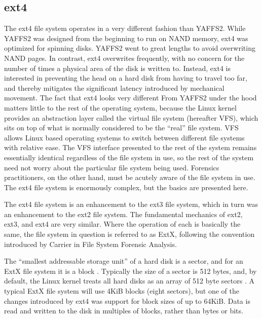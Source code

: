 \subsection{ext4}
The ext4 file system operates in a very different fashion than YAFFS2. While YAFFS2 was designed from the beginning to run on NAND
memory, ext4 was optimized for spinning disks. YAFFS2 went to great lengths to avoid overwriting NAND pages. In contrast, ext4
overwrites frequently, with no concern for the number of times a physical area of the disk is written to. Instead, ext4 is
interested in preventing the head on a hard disk from having to travel too far, and thereby mitigates the significant latency
introduced by mechanical movement. The fact that ext4 looks very different From YAFFS2 under the hood matters little to the rest of
the operating system, because the Linux kernel provides an abstraction layer called the virtual file system (hereafter VFS), which
sits on top of what is normally considered to be the ``real'' file system. VFS allows Linux based operating systems to switch
between different file systems with relative ease. The VFS interface presented to the rest of the system remains essentially
identical regardless of the file system in use, so the rest of the system need not worry about the particular file system being
used. Forensics practitioners, on the other hand, must be acutely aware of the file system in use. The ext4 file system is
enormously complex, but the basics are presented here.

The ext4 file system is an enhancement to the ext3 file system, which in turn was an enhancement to the
ext2 file system. The fundamental mechanics of ext2, ext3, and ext4 are very similar. Where the
operation of each is basically the same, the file system in question is referred to as ExtX, following the convention
introduced by Carrier \citeyear{carrier} in File System Forensic Analysis. 

The ``smallest addressable storage unit'' of a hard disk is a sector, and for an ExtX file system it is a block
\cite[Chapter 14]{carrier}. Typically the size of a sector is 512 bytes, and, by default, the Linux kernel treats all hard disks as
an array of 512 byte sectors \cite{linuxdrivers}.  A typical ExtX file system will use 4KiB blocks (eight sectors), but one
of the changes introduced by ext4 was support for block sizes of up to 64KiB. Data is read and written to the disk in
multiples of blocks, rather than bytes or bits. 

